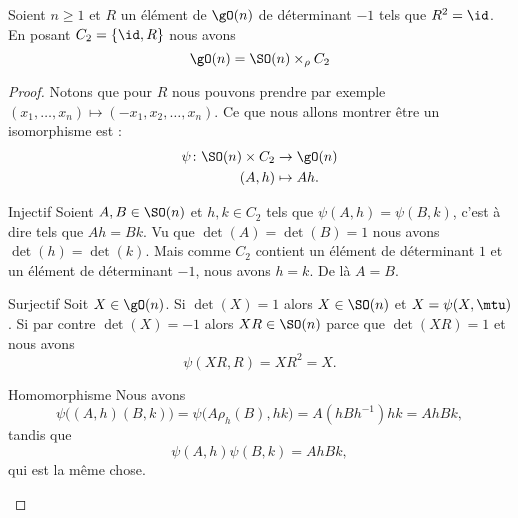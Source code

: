 \begin{proposition}      \label{PROPooDHYWooXxEXvl}
    Soient \( n\geq 1\) et \( R\) un élément de \( \gO(n)\) de déterminant \( -1\) tels que \( R^2=\id\). En posant \( C_2=\{ \id,R \}\) nous avons
    \begin{equation}
        \gO(n)=\SO(n)\times_{\rho} C_2
    \end{equation}
\end{proposition}

\begin{proof}
    Notons que pour \( R\) nous pouvons prendre par exemple \( (x_1,\ldots, x_n)\mapsto (-x_1,x_2,\ldots, x_n)\). Ce que nous allons montrer être un isomorphisme est :
    \begin{equation}
        \begin{aligned}
            \psi\colon \SO(n)\times C_2&\to \gO(n) \\
            (A,h)&\mapsto Ah. 
        \end{aligned}
    \end{equation}
    \begin{subproof}
        \item[Injectif]
            Soient \( A,B\in \SO(n)\) et \( h,k\in C_2\) tels que \( \psi(A,h)=\psi(B,k)\), c'est à dire tels que \( Ah=Bk\). Vu que \( \det(A)=\det(B)=1\) nous avons \( \det(h)=\det(k)\). Mais comme \( C_2\) contient un élément de déterminant \( 1\) et un élément de déterminant \( -1\), nous avons \( h=k\). De là \( A=B\).
        \item[Surjectif]
            Soit \( X\in\gO(n)\). Si \( \det(X)=1\) alors \( X\in \SO(n)\) et \( X=\psi(X,\mtu)\). Si par contre \( \det(X)=-1\) alors \( XR\in\SO(n)\) parce que \( \det(XR)=1\) et nous avons
            \begin{equation}
                \psi(XR,R)=XR^2=X.
            \end{equation}
        \item[Homomorphisme]
            Nous avons
            \begin{equation}
                \psi\Big( (A,h)(B,k) \Big)=\psi\big( A\rho_h(B),hk \big)=A(hBh^{-1})hk=AhBk,
            \end{equation}
            tandis que
            \begin{equation}
                \psi(A,h)\psi(B,k)=AhBk,
            \end{equation}
            qui est la même chose.
    \end{subproof}
\end{proof}

